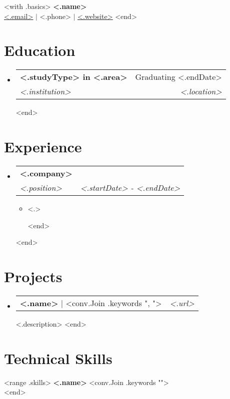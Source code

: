 \documentclass[letterpaper,12pt]{article}
\makeatletter
\newcommand{\resumeItem}[1]{
  \item\small{
    {#1 \vspace{-2pt}}
  }
}
\newcommand{\resumeSubheading}[4]{
  \vspace{-2pt}\item
    \begin{tabular*}{0.97\textwidth}[t]{l@{\extracolsep{\fill}}r}
      \textbf{#1} & #2 \\
      \textit{#3} & \textit{ #4} \\
    \end{tabular*}\vspace{-7pt}
}
\newcommand{\resumeProjectHeading}[4]{
  \vspace{-2pt}\item
    \begin{tabular*}{0.97\textwidth}[t]{l@{\extracolsep{\fill}}r}
      \textbf{#1} | #2 & \textit{\small#3} \\
    \end{tabular*}
}
\newcommand{\resumeSubHeadingListStart}{\begin{itemize}[leftmargin=0.15in, label={}]}
\newcommand{\resumeSubHeadingListEnd}{\end{itemize}}
\newcommand{\resumeItemListStart}{\begin{itemize}}
\newcommand{\resumeItemListEnd}{\end{itemize}\vspace{-5pt}}
\makeatother
\begin{document}
\begin{center}
	<with .basics>
    \textbf{\Huge <.name>} \\ \vspace{1pt}
    \href{mailto:<.email>}{\ul{<.email>}} $|$ 
    \small <.phone> $|$ 
    \href{<.website>}{\ul{<.website>}}
	<end>
\end{center}


\section{Education}
  \resumeSubHeadingListStart
    <range .education>
    \resumeSubheading
      {<.studyType> in <.area>}{Graduating <.endDate>}
      {<.institution>}{<.location>}
	<end>
  \resumeSubHeadingListEnd



\section{Experience}
  \resumeSubHeadingListStart
    <range .work>
    \resumeSubheading
      {<.company>}{}
	  {<.position>}{<.startDate> - <.endDate>}
      \resumeItemListStart
	    <range .highlights>
        \resumeItem{<.>}
        <end>
      \resumeItemListEnd
	<end>
  \resumeSubHeadingListEnd


\section{Projects}
  \resumeSubHeadingListStart
    <range .projects>
    \resumeProjectHeading
        {<.name>}{<conv.Join .keywords ", ">}{<.url>}
        \resumeItem{<.description>}
    <end>
  \resumeSubHeadingListEnd

%
\section{Technical Skills}
 \begin{itemize}[leftmargin=0.15in, label={}]
    \small{\item{
	  <range .skills>
      \textbf{<.name>}{ <conv.Join .keywords "">} \\
	  <end>
    }}
 \end{itemize}


\end{document}
